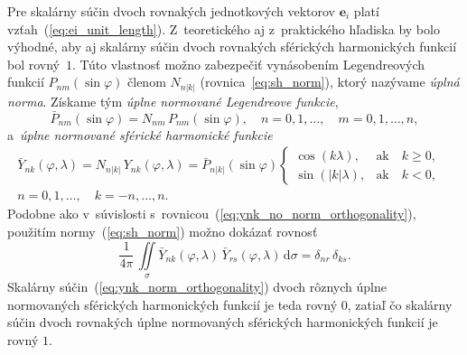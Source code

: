 \documentclass[a4paper, 12pt]{book}
\newcommand{\diff}{\mathrm d}
\let\vec\mathbf
\begin{document}
Pre skalárny súčin dvoch rovnakých jednotkových vektorov $\vec e_i$ platí 
vzťah~(\ref{eq:ei_unit_length}).  Z~teoretického aj z~praktického hľadiska by 
bolo výhodné, aby aj skalárny súčin dvoch rovnakých sférických harmonických 
funkcií bol rovný~$1$.  Túto vlastnosť možno zabezpečiť vynásobením 
Legendreových funkcií $P_{nm}(\sin\varphi)$ členom $N_{n|k|}$ 
(rovnica~\ref{eq:sh_norm}), ktorý nazývame \emph{úplná norma}.  Získame tým 
\emph{úplne normované Legendreove funkcie},
%
\begin{equation}
\bar{P}_{nm}(\sin\varphi) = N_{nm} \, P_{nm}(\sin\varphi){,} \quad  n = 0, 1, 
\dots,
\quad m = 0, 1, \dots, n{,}
\end{equation}
%
a~\emph{úplne normované sférické harmonické funkcie}
%
\begin{equation}
\label{eq:ynk_norm}
\begin{split}
\bar{Y}_{nk}(\varphi, \lambda) = N_{n|k|} \, Y_{nk}(\varphi, \lambda)
= \bar{P}_{n|k|}(\sin\varphi)
%
\begin{cases}
\cos(k\lambda){,}    &\text{ak} \quad k \geq 0{,}\\
\sin(|k|\lambda){,}  &\text{ak} \quad k < 0{,}
\end{cases}
&
%
\\
n = 0, 1, \dots, \quad k = -n, \dots, n{.}&
\end{split}
\end{equation}
%
Podobne ako v~súvislosti s~rovnicou~(\ref{eq:ynk_no_norm_orthogonality}), 
použitím normy~(\ref{eq:sh_norm}) možno dokázať rovnosť
%
\begin{equation}
\label{eq:ynk_norm_orthogonality}
\frac{1}{4\pi} \, \iint\limits_{\sigma} \bar{Y}_{nk}(\varphi, \lambda) \,
\bar{Y}_{rs}(\varphi, \lambda) \, \diff \sigma = \delta_{nr} \, \delta_{ks}{.}
\end{equation}
%
Skalárny súčin~(\ref{eq:ynk_norm_orthogonality}) dvoch rôznych úplne
normovaných sférických harmonických funkcií je teda rovný 0, zatiaľ čo skalárny
súčin dvoch rovnakých úplne normovaných sférických harmonických funkcií je
rovný $1$.
\end{document}
